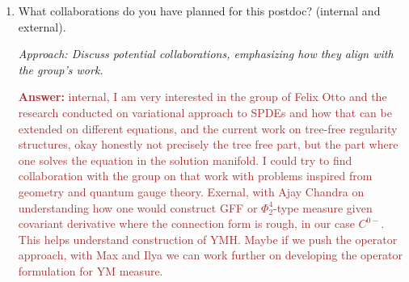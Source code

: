 \documentclass[12pt]{article}
\numberwithin{equation}{section}
\newcommand{\brown}[1]{\textcolor{brown}{#1}}
\begin{document}
\begin{enumerate}
    \item What collaborations do you have planned for this postdoc? (internal and external).
    
    \textit{Approach: Discuss potential collaborations, emphasizing how they align with the group’s work.}

    \brown{\textbf{Answer:} internal, I am very interested in the group of Felix Otto and the research conducted on variational approach to SPDEs and how that can be extended on different equations, and the current work on tree-free regularity structures, okay honestly not precisely the tree free part, but the part where one solves the equation in the solution manifold. I could try to find collaboration with the group on that work with problems inspired from geometry and quantum gauge theory. Exernal, with Ajay Chandra on understanding how one would construct GFF or $\Phi^4_2$-type measure given covariant derivative where the connection form is rough, in our case $C^{0-}$. This helps understand construction of YMH. Maybe if we push the operator approach, with Max and Ilya we can work further on developing the operator formulation for YM measure.}
\end{enumerate}
\end{document}
